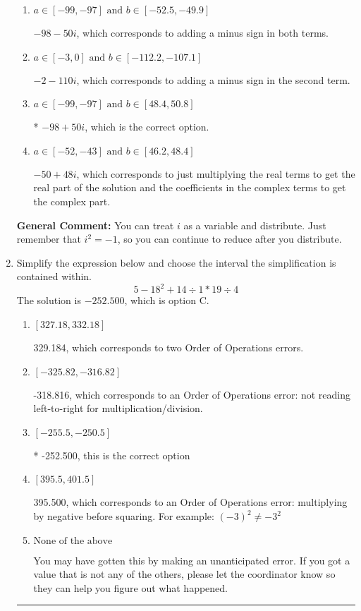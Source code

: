 \documentclass{extbook}[14pt]
\newcommand{\litem}[1]{\item #1

\rule{\textwidth}{0.4pt}}
\begin{document}
\begin{enumerate}
{\begin{enumerate}[label=\Alph*.]
 $-2 + 110 i$, which corresponds to adding a minus sign in the first term.
\item \( a \in [-99, -97] \text{ and } b \in [-52.5, -49.9] \)

 $-98 - 50 i$, which corresponds to adding a minus sign in both terms.
\item \( a \in [-3, 0] \text{ and } b \in [-112.2, -107.1] \)

 $-2 - 110 i$, which corresponds to adding a minus sign in the second term.
\item \( a \in [-99, -97] \text{ and } b \in [48.4, 50.8] \)

* $-98 + 50 i$, which is the correct option.
\item \( a \in [-52, -43] \text{ and } b \in [46.2, 48.4] \)

 $-50 + 48 i$, which corresponds to just multiplying the real terms to get the real part of the solution and the coefficients in the complex terms to get the complex part.
\end{enumerate}

\textbf{General Comment:} You can treat $i$ as a variable and distribute. Just remember that $i^2=-1$, so you can continue to reduce after you distribute.
}
\litem{
Simplify the expression below and choose the interval the simplification is contained within.
\[ 5 - 18^2 + 14 \div 1 * 19 \div 4 \]The solution is \( -252.500 \), which is option C.\begin{enumerate}[label=\Alph*.]
\item \( [327.18, 332.18] \)

 329.184, which corresponds to two Order of Operations errors.
\item \( [-325.82, -316.82] \)

 -318.816, which corresponds to an Order of Operations error: not reading left-to-right for multiplication/division.
\item \( [-255.5, -250.5] \)

* -252.500, this is the correct option
\item \( [395.5, 401.5] \)

 395.500, which corresponds to an Order of Operations error: multiplying by negative before squaring. For example: $(-3)^2 \neq -3^2$
\item \( \text{None of the above} \)

 You may have gotten this by making an unanticipated error. If you got a value that is not any of the others, please let the coordinator know so they can help you figure out what happened.
\end{enumerate}

}
\end{enumerate}
\end{document}
